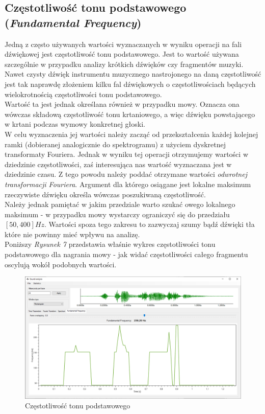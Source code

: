 \documentclass[a4paper]{article}
\begin{document}
\subsection{Częstotliwość tonu podstawowego (\textit{Fundamental Frequency})}
Jedną z często używanych wartości wyznaczanych w wyniku operacji na fali dźwiękowej jest częstotliwość tonu podstawowego. Jest to wartość używana szczególnie w przypadku analizy krótkich dźwięków czy fragmentów muzyki. Nawet czysty dźwięk instrumentu muzycznego nastrojonego na daną częstotliwość jest tak naprawdę złożeniem kilku fal dźwiękowych o częstotliwościach będących wielokrotnością częstotliwości tonu podstawowego.\\
Wartość ta jest jednak określana również w przypadku mowy. Oznacza ona wówczas składową częstotliwość tonu krtaniowego, a więc dźwięku powstającego w krtani podczas wymowy konkretnej głoski.\\
W celu wyznaczenia jej wartości należy zacząć od przekształcenia każdej kolejnej ramki (dobieranej analogicznie do spektrogramu) z użyciem dyskretnej transformaty Fouriera. Jednak w wyniku tej operacji otrzymujemy wartości w dziedzinie częstotliwości, zaś interesująca nas wartość wyznaczana jest w dziedzinie czasu. Z tego powodu należy poddać otrzymane wartości \textit{odwrotnej transformacji Fouriera}. Argument dla którego osiągane jest lokalne maksimum rzeczywiste dźwięku określa wówczas poszukiwaną częstotliwość.\\
Należy jednak pamiętać w jakim przedziale warto szukać owego lokalnego maksimum - w przypadku mowy wystarczy ograniczyć się do przedziału $[50, 400] Hz$. Wartości spoza tego zakresu to zazwyczaj szumy bądź dźwięki tła które nie powinny mieć wpływu na analizę.\\
Poniższy \textit{Rysunek 7} przedstawia właśnie wykres częstotliwości tonu podstawowego dla nagrania mowy - jak widać częstotliwości całego fragmentu oscylują wokół podobnych wartości.
\begin{figure}[H]
  \includegraphics[width=\linewidth]{images/07fundamentalFrequency.png}
  \caption{Częstotliwość tonu podstawowego}
\end{figure}
\end{document}
